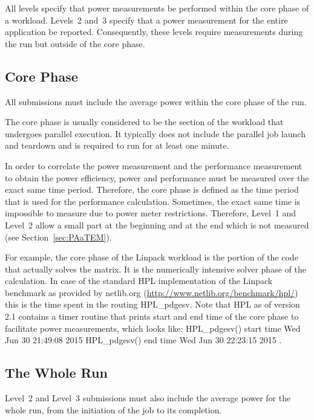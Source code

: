 \noindent
All levels specify that power measurements be performed within the core phase of a workload.
Levels~2 and~3 specify that a power measurement for the entire application be reported.
Consequently, these levels require measurements during the run but outside of the core phase.

\subsection{Core Phase}
\label{sec:core_phase}
\noindent
All submissions must include the average power within the core phase of the run.
\wl

\noindent
The core phase is usually considered to be the section of the workload that undergoes parallel execution.
It typically does not include the parallel job launch and teardown and is required to run for at least one minute.
\wl

\noindent
In order to correlate the power measurement and the performance measurement to obtain the power efficiency, power and performance must be measured over the exact same time period.
Therefore, the core phase is defined as the time period that is used for the performance calculation.
Sometimes, the exact same time is impossible to measure due to power meter restrictions.
Therefore, Level~1 and Level~2 allow a small part at the beginning and at the end which is not measured (see Section~\ref{sec:PAaTEM}).
\wl

\noindent
For example, the core phase of the Linpack workload is the portion of the code that actually solves the matrix.
It is the numerically intensive solver phase of the calculation.
In case of the standard HPL implementation of the Linpack benchmark as provided by netlib.org (\url{http://www.netlib.org/benchmark/hpl/}) this is the time spent in the routing {\ttfamily HPL\_pdgesv}.
Note that HPL as of version 2.1 contains a timer routine that prints start and end time of the core phase to facilitate power measurements, which looks like:\newline
{\ttfamily
HPL\_pdgesv() start time Wed Jun 30 21:49:08 2015\newline
HPL\_pdgesv() end time Wed Jun 30 22:23:15 2015
}.

\subsection{The Whole Run}
\noindent
Level~2 and Level~3 submissions must also include the average power for the whole run, from the initiation of the job to its completion.
\wl

